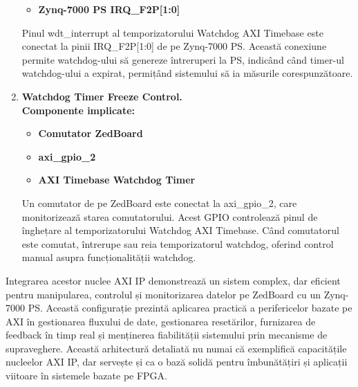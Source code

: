\documentclass[12pt]{article}
\begin{document}
\begin{enumerate}
\begin{itemize}
            \item \textbf{Zynq-7000 PS IRQ\_F2P[1:0]}
        \end{itemize}
    \hspace*{1cm}Pinul wdt\_interrupt al temporizatorului Watchdog AXI Timebase este conectat la pinii IRQ\_F2P[1:0] de pe Zynq-7000 PS. Această conexiune permite watchdog-ului să genereze întreruperi la PS, indicând când timer-ul watchdog-ului a expirat, permițând sistemului să ia măsurile corespunzătoare.
    \item \textbf{Watchdog Timer Freeze Control.} \\
    \textbf{Componente implicate:}
        \begin{itemize}
            \item \textbf{Comutator ZedBoard}
            \item \textbf{axi\_gpio\_2}
            \item \textbf{AXI Timebase Watchdog Timer}
        \end{itemize}
    \hspace*{1cm}Un comutator de pe ZedBoard este conectat la axi\_gpio\_2, care monitorizează starea comutatorului. Acest GPIO controlează pinul de înghețare al temporizatorului Watchdog AXI Timebase. Când comutatorul este comutat, întrerupe sau reia temporizatorul watchdog, oferind control manual asupra funcționalității watchdog.
\end{enumerate}
\hspace*{1cm}Integrarea acestor nuclee AXI IP demonstrează un sistem complex, dar eficient pentru manipularea, controlul și monitorizarea datelor pe ZedBoard cu un Zynq-7000 PS. Această configurație prezintă aplicarea practică a perifericelor bazate pe AXI în gestionarea fluxului de date, gestionarea resetărilor, furnizarea de feedback în timp real și menținerea fiabilității sistemului prin mecanisme de supraveghere. Această arhitectură detaliată nu numai că exemplifică capacitățile nucleelor AXI IP, dar servește și ca o bază solidă pentru îmbunătățiri și aplicații viitoare în sistemele bazate pe FPGA.
\end{document}
